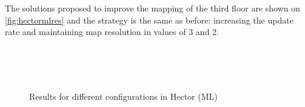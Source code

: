 The solutions proposed to improve the mapping of the third floor are shown on \autoref{fig:hectormlres} and the strategy is the same as before: increasing the update rate and maintaining map resolution in values of 3 and 2.
\begin{figure}[t!]
  \centering
   \\
   \\
   \\
  \caption{Results for different configurations in Hector (ML)}
  \label{fig:hectormlres}
\end{figure}

